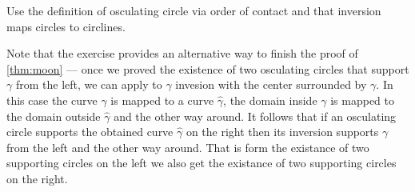  Use the definition of osculating circle via order of contact and that inversion maps circles to circlines. 


Note that the exercise provides an alternative way to finish the proof of \ref{thm:moon} --- once we proved the existence of two osculating circles that support $\gamma$ from the left,
we can apply to $\gamma$ invesion with the center surrounded by $\gamma$.
In this case the curve $\gamma$ is mapped to a curve $\hat \gamma$,
the domain inside $\gamma$ is mapped to the domain outside $\hat\gamma$ and the other way around.
It follows that if an osculating circle supports the obtained curve $\hat\gamma$ on the right 
then its inversion supports  $\gamma$ from the left and the other way around.
That is form the existance of two supporting circles on the left we also get the existance of two supporting circles on the right.


